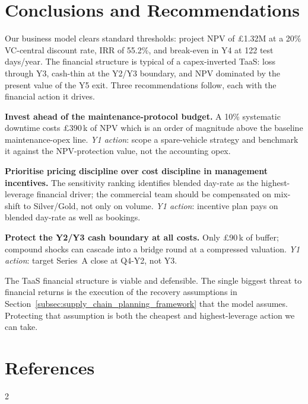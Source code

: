 \documentclass[11pt, a4paper]{report}
\numberwithin{equation}{section}
\newcommand{\compactbib}{%
  \vspace{-16pt}%
  \enlargethispage{20pt}%
  \section*{References}%
  \vspace{-33pt}%
  \begingroup
    \begin{singlespace}%
      \begin{multicols}{2}%
        \scriptsize
        \setlength{\bibitemsep}{0pt}%
        \printbibliography[heading=none]%
      \end{multicols}%
    \end{singlespace}%
  \endgroup
}
\newcommand{\breakEvenYear}{Y4\xspace}
\newcommand{\breakEvenDays}{122\xspace}
\newcommand{\npvBase}{\pounds1.32M\xspace}
\newcommand{\irr}{55.2\%\xspace}
\begin{document}
\begin{refsection}
\section{Conclusions and Recommendations}
\label{ch:concl}

Our business model clears standard
thresholds: project NPV of \npvBase at a 20\%
VC-central discount rate, IRR of \irr, and break-even in
\breakEvenYear at \breakEvenDays test days/year. The financial
structure is typical of a capex-inverted TaaS: loss
through Y3, cash-thin at the Y2/Y3 boundary, and NPV dominated by
the present value of the Y5 exit. Three recommendations follow, each with the financial action it drives.

\begin{tightenumerate}
  \item \textbf{Invest ahead of the maintenance-protocol budget.}
        A 10\% systematic downtime costs \pounds390\,k of NPV which is
        an order of magnitude above the baseline maintenance-opex
        line. \emph{Y1 action}: scope a spare-vehicle strategy
        and benchmark it against the NPV-protection value, not
        the accounting opex.
  \item \textbf{Prioritise pricing discipline over cost discipline
        in management incentives.} The sensitivity ranking
        identifies blended day-rate as the highest-leverage
        financial driver; the commercial team should be
        compensated on mix-shift to Silver/Gold, not only on
        volume. \emph{Y1 action}: incentive plan pays on blended
        day-rate as well as bookings.
  \item \textbf{Protect the Y2/Y3 cash boundary at all costs.}
        Only \pounds90\,k of buffer; compound shocks can
        cascade into a bridge round at a compressed valuation.
        \emph{Y1 action}: target Series~A close at Q4-Y2, not Y3.
\end{tightenumerate}

\medskip

\noindent The TaaS financial structure is viable and
defensible. The single biggest threat to financial returns is
the execution of the recovery assumptions in Section~\ref{subsec:supply_chain_planning_framework} that the model assumes.
Protecting that assumption is both the cheapest and
highest-leverage action we can take.

\compactbib
\end{refsection}
\end{document}
